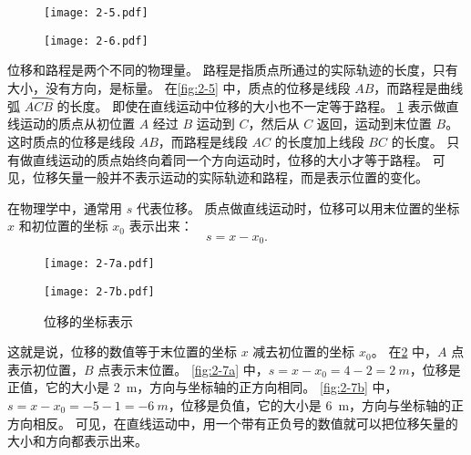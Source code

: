 \begin{figure}
  \begin{minipage}[b]{0.45\linewidth}\centering
    \texttt{[image: 2-5.pdf]}
    \caption{}\label{fig:2-5}
  \end{minipage}%
  \begin{minipage}[b]{0.55\linewidth}\centering
    \texttt{[image: 2-6.pdf]}
    \caption{}\label{fig:2-6}
  \end{minipage}
\end{figure}


位移和路程是两个不同的物理量。
路程是指质点所通过的实际轨迹的长度，只有大小，没有方向，是标量。
在\cref{fig:2-5} 中，质点的位移是线段 $AB$，而路程是曲线弧 $\overparen{ACB}$ 的长度。
即使在直线运动中位移的大小也不一定等于路程。
\cref{fig:2-6} 表示做直线运动的质点从初位置 $A$ 经过 $B$ 运动到 $C$，然后从 $C$ 返回，运动到末位置 $B$。
这时质点的位移是线段 $AB$，而路程是线段 $AC$ 的长度加上线段 $BC$ 的长度。
只有做直线运动的质点始终向着同一个方向运动时，位移的大小才等于路程。
可见，位移矢量一般并不表示运动的实际轨迹和路程，而是表示位置的变化。

在物理学中，通常用 $s$ 代表位移。
质点做直线运动时，位移可以用末位置的坐标 $x$ 和初位置的坐标 $x_0$ 表示出来：
\[s=x-x_0.\]
\begin{figure}
  \begin{minipage}{0.1\linewidth}\raggedleft
    \subcaption{}\label{fig:2-7a}
  \end{minipage}%
  \begin{minipage}{0.9\linewidth}
    \texttt{[image: 2-7a.pdf]}
  \end{minipage}
  \begin{minipage}{0.1\linewidth}\raggedleft
    \subcaption{}\label{fig:2-7b}
  \end{minipage}%
  \begin{minipage}{0.9\linewidth}
    \texttt{[image: 2-7b.pdf]}
  \end{minipage}
  \caption{位移的坐标表示}\label{fig:2-7}
\end{figure}

这就是说，位移的数值等于末位置的坐标 $x$ 减去初位置的坐标 $x_0$。
在\cref{fig:2-7} 中，$A$ 点表示初位置，$B$ 点表示末位置。
\cref{fig:2-7a} 中，$s=x-x_0=4-2=\qty{2}{m}$，位移是正值，它的大小是 \qty{2}{m}，方向与坐标轴的正方向相同。
\cref{fig:2-7b} 中，$s=x-x_0=-5-1=\qty{-6}{m}$，位移是负值，它的大小是 \qty{6}{m}，方向与坐标轴的正方向相反。
可见，在直线运动中，用一个带有正负号的数值就可以把位移矢量的大小和方向都表示出来。

